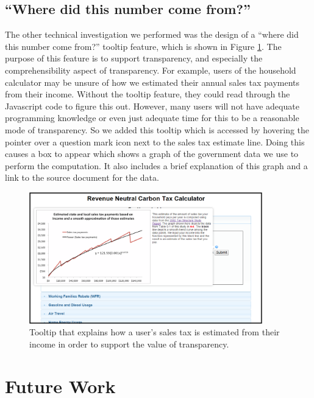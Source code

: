 \documentclass{sigchi}
\begin{document}
\subsection{``Where did this number come from?''}
The other technical investigation we performed was the design of a ``where did this number come from?'' tooltip feature, which is shown in Figure \ref{fig:tooltip}. The purpose of this feature is to support transparency, and especially the comprehensibility aspect of transparency. 
For example, users of the household calculator may be unsure of how we estimated their annual sales tax payments 
from their income. Without the tooltip feature, they could read through the Javascript code to figure this out. 
However, many users will not have adequate programming knowledge or even just adequate time for this to be a 
reasonable mode of transparency. So we added this tooltip which is accessed by hovering the pointer over a question mark icon 
next to the sales tax estimate line. Doing this causes a box to appear which shows a graph of the government data we use to perform the 
computation. It also includes a brief explanation of this graph and a link to the source document for the data. 
\begin{figure}[t]
\centering
\includegraphics[width=0.9\textwidth]{toolTipDemo}
\caption{Tooltip that explains how a user's sales tax is estimated from their income in order to support the value of transparency.}
\label{fig:tooltip}
\end{figure}


\section{Future Work}
\end{document}
